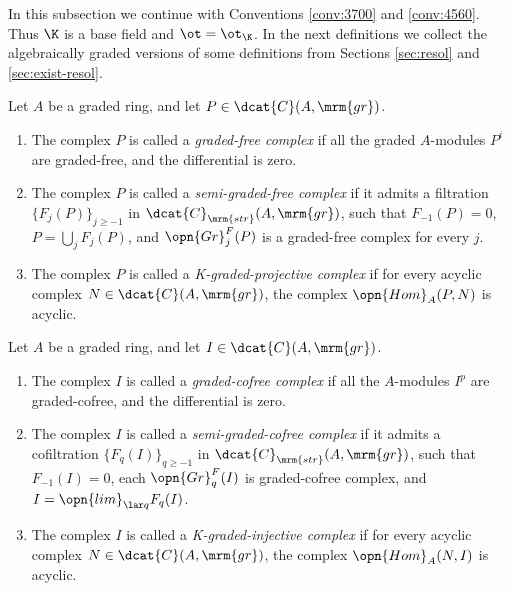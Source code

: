 \label{gr-res-der-fun}

In this subsection we continue with Conventions \ref{conv:3700} and 
\ref{conv:4560}. Thus $\K$ is a base field and $\ot = \ot_{\K}$. 
In the next definitions we collect the algebraically graded versions of some 
definitions from Sections \ref{sec:resol} and \ref{sec:exist-resol}.

\begin{dfn} \label{dfn:4275}   
Let $A$ be a graded ring, and let $P \in \dcat{C}(A, \mrm{gr})$. 
\begin{enumerate}
\item  The complex $P$ is called a
{\em graded-free complex}%
if all the graded $A$-modules $P^i$ are 
graded-free, and the differential is zero. 

\item The complex $P$ is called a
{\em semi-graded-free complex}%
if it admits a filtration 
$\{ F_j(P) \}_{j \geq -1}$ in $\dcat{C}_{\mrm{str}}(A, \mrm{gr})$, 
such that $F_{-1}(P) = 0$, 
$P = \bigcup_j F_j(P)$, and 
$\opn{Gr}^F_j(P)$ is a graded-free complex for every $j$. 

\item The complex $P$ is called a 
{\em K-graded-projective complex}%
if for every acyclic complex $N \in \dcat{C}(A, \mrm{gr})$, the complex 
$\opn{Hom}_A(P, N)$ is acyclic.
\end{enumerate}
\end{dfn}

\begin{dfn} \label{dfn:4276}   
Let $A$ be a graded ring, and let $I \in \dcat{C}(A, \mrm{gr})$. 
\begin{enumerate}
\item  The complex $I$ is called a 
{\em graded-cofree complex}%
if all the $A$-modules $I^p$ are graded-cofree, and the differential is zero.

\item The complex $I$ is called a 
{\em semi-graded-cofree complex}%
if it admits a cofiltration $\{ F_q(I) \}_{q \geq -1}$ in 
$\dcat{C}_{\mrm{str}}(A, \mrm{gr})$, such that $F_{-1}(I) = 0$, each 
$\opn{Gr}^F_q(I)$ is graded-cofree complex, and 
$I = \opn{lim}_{\lar q} F_q(I)$.

\item The complex $I$ is called a 
{\em K-graded-injective complex}%
if for every acyclic complex $N \in \dcat{C}(A, \mrm{gr})$, the complex
$\opn{Hom}_A(N, I)$ is acyclic. 
\end{enumerate}
\end{dfn}

